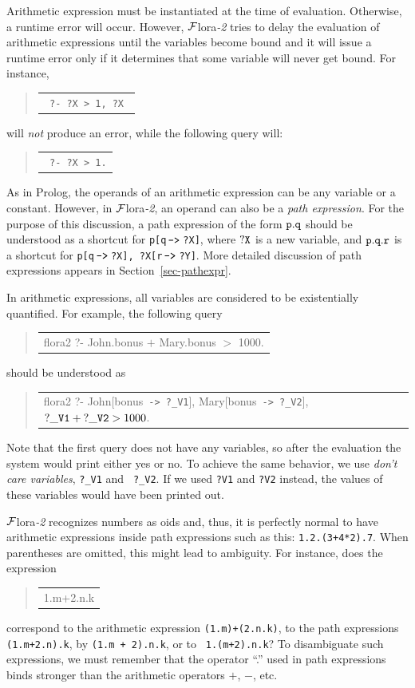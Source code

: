 \documentclass[11pt]{article}
\newcommand{\FLSYSTEM}{{\mbox{\sc ${\cal F}${lora}\rm\emph{-2}}}\xspace}
\newcommand{\prompt}{flora2 ?- }
\newenvironment{qrules}{\begin{quote}\tt\begin{tabular}[t]{l}}%
{\end{tabular}\end{quote}}
\newcommand{\mvd}{{\mbox{\tt \,->\,}}}  %
\newcommand{\bs}{{\ensuremath\backslash}}
\begin{document}
Arithmetic expression must be instantiated at the time of
evaluation. Otherwise, a runtime error will occur.
However, \FLSYSTEM tries to delay the evaluation of arithmetic expressions
until the variables become bound and it will issue a runtime error only if
it determines that some variable will never get bound.
For instance,
\begin{qrules}
  \tt
?- ?X > 1, ?X \bs{}is 1+1.
\end{qrules}
will \emph{not}  produce an error, while the following query will:
\begin{qrules}
  \tt
?-  ?X > 1.
\end{qrules}

As in Prolog, the operands of an arithmetic expression can be any variable
or a constant. However, in \FLSYSTEM, an operand can also be a \emph{path
  expression}. For the purpose of this discussion, a path expression of the
form $\tt p.q$ should be understood as a shortcut for {\tt p[q$\mvd$?X]}, where
$\tt ?X$ is a new variable, and $\tt p.q.r$ is a shortcut for {\tt p[q$\mvd$?X],
  ?X[r$\mvd$?Y]}. More detailed discussion
of path expressions appears in Section~\ref{sec-pathexpr}.

In arithmetic expressions, all variables are considered to be
existentially quantified. For example, the following query
\begin{qrules}
\prompt John.bonus $+$ Mary.bonus $>$ 1000.
\end{qrules}
should be understood as
\begin{qrules}
\prompt John[bonus{\mvd}{\tt ?\_V1}], Mary[bonus{\mvd}{\tt ?\_V2}], ${\tt ?\_V1}+{\tt ?\_V2} > 1000$.
\end{qrules}
Note that the first query does not have any variables, so after the
evaluation the system would print either yes or no. To achieve the same
behavior, we use \emph{don't care variables}, {\tt ?\_V1} and {\tt
  ?\_V2}. If we used {\tt ?V1} and {\tt ?V2} instead, the values of these
variables would have been printed out.

\FLSYSTEM recognizes numbers as oids and, thus, it is perfectly normal to have
arithmetic expressions inside path expressions such as this:
{\tt 1.2.(3+4*2).7}. When parentheses are omitted, this might lead to
ambiguity.
For instance, does the expression
\begin{qrules}
1.m+2.n.k
\end{qrules}
correspond to
the arithmetic expression {\tt (1.m)+(2.n.k)}, to
the path expressions {\tt (1.m+2.n).k}, by {\tt (1.m + 2).n.k}, or to {\tt
  1.(m+2).n.k}? To disambiguate such expressions, we must remember that the
operator ``.'' used in path expressions binds stronger than the
arithmetic operators $+$, $-$, etc.
\end{document}
